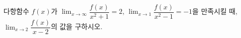 다항함수 $f(x)$가 $\displaystyle\lim_{x\to\infty}\dfrac{f(x)}{x^2+1}=2$, $\displaystyle\lim_{x\to 1}\dfrac{f(x)}{x^2-1}=-1$을 만족시킬 때, $\displaystyle\lim_{x\to 2}\dfrac{f(x)}{x-2}$의 값을 구하시오.
